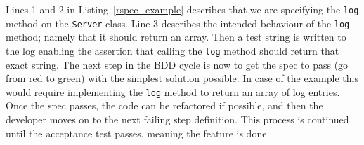 Lines 1 and 2 in Listing~\ref{rspec_example} describes that we are specifying
the \texttt{log} method on the \texttt{Server} class. Line 3 describes the
intended behaviour of the \texttt{log} method; namely that it should return an
array. Then a test string is written to the log enabling the assertion that
calling the \texttt{log} method should return that exact string. The next step
in the BDD cycle is now to get the spec to pass (go from red to green) with the
simplest solution possible. In case of the example this would require
implementing the \texttt{log} method to return an array of log entries. Once the
spec passes, the code can be refactored if possible, and then the developer
moves on to the next failing step definition.  This process is continued until
the acceptance test passes, meaning the feature is done.
